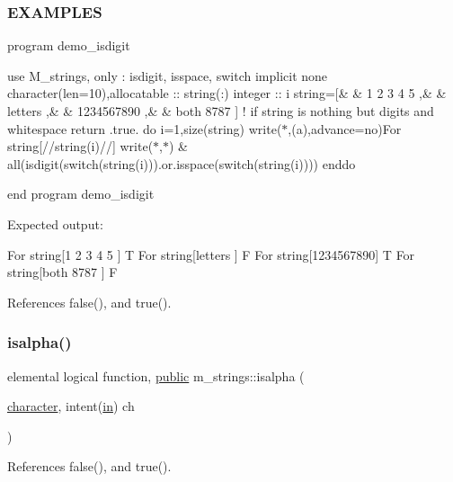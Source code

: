 \subsubsection*{E\+X\+A\+M\+P\+L\+ES}

program demo\+\_\+isdigit

use M\+\_\+strings, only \+: isdigit, isspace, switch implicit none character(len=10),allocatable \+:\+: string(\+:) integer \+:\+: i string=\mbox{[}\& \& \textquotesingle{}1 2 3 4 5 \textquotesingle{} ,\& \& \textquotesingle{}letters \textquotesingle{} ,\& \& \textquotesingle{}1234567890\textquotesingle{} ,\& \& \textquotesingle{}both 8787 \textquotesingle{} \mbox{]} ! if string is nothing but digits and whitespace return .true. do i=1,size(string) write($\ast$,\textquotesingle{}(a)\textquotesingle{},advance=\textquotesingle{}no\textquotesingle{})\textquotesingle{}For string\mbox{[}\textquotesingle{}//string(i)//\textquotesingle{}\mbox{]}\textquotesingle{} write($\ast$,$\ast$) \& all(isdigit(switch(string(i))).or.\+isspace(switch(string(i)))) enddo

end program demo\+\_\+isdigit

Expected output\+:

For string\mbox{[}1 2 3 4 5 \mbox{]} T For string\mbox{[}letters \mbox{]} F For string\mbox{[}1234567890\mbox{]} T For string\mbox{[}both 8787 \mbox{]} F 

References false(), and true().

\mbox{\label{namespacem__strings_a5cf6d7fbd1b3ea17e37c6213c6ba0fdb}} 
\subsubsection{\texorpdfstring{isalpha()}{isalpha()}}
{\footnotesize\ttfamily elemental logical function, \hyperlink{M__stopwatch_83_8txt_a2f74811300c361e53b430611a7d1769f}{public} m\+\_\+strings\+::isalpha (\begin{DoxyParamCaption}\item[{\hyperlink{option__stopwatch_83_8txt_abd4b21fbbd175834027b5224bfe97e66}{character}, intent(\hyperlink{M__journal_83_8txt_afce72651d1eed785a2132bee863b2f38}{in})}]{ch }\end{DoxyParamCaption})}



References false(), and true().

